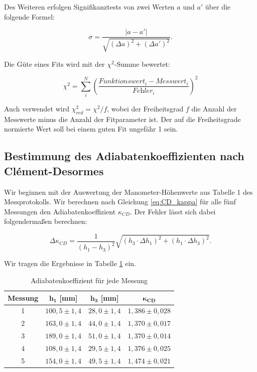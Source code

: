 \documentclass{article}
\begin{document}
Des Weiteren erfolgen Signifikanztests von zwei Werten $a$ und $a'$ über die folgende Formel:

\begin{equation}
    \sigma = \frac{|a-a'|}{\sqrt{(\Delta a)^2 + (\Delta a')^2}}.
\end{equation}

Die Güte eines Fits wird mit der $\chi^2$-Summe bewertet:

\begin{equation}
    \chi^2 = \sum_i^N \left( \frac{\textit{Funktionswert}_i - \textit{Messwert}_i}{\textit{Fehler}_i} \right)^2
\end{equation}

Auch verwendet wird $\chi^2_{red} = \chi^2 / f$, wobei der Freiheitsgrad $f$ die Anzahl der Messwerte minus die Anzahl der Fitparameter ist. Der auf die Freiheitsgrade normierte Wert soll bei einem guten Fit ungefähr 1 sein.

\newpage

\subsection{Bestimmung des Adiabatenkoeffizienten nach Clément-Desormes}

Wir beginnen mit der Auswertung der Manometer-Höhenwerte aus Tabelle 1 des Messprotokolls. Wir berechnen nach Gleichung \ref{eq:CD_kappa} für alle fünf Messungen den Adiabatenkoeffizient $\kappa_{CD}$. Der Fehler lässt sich dabei folgendermaßen berechnen:

\begin{equation}
    \Delta \kappa_{CD} = \frac{1}{(h_1 - h_3)^2} \sqrt{(h_3 \cdot \Delta h_1)^2 + (h_1 \cdot \Delta h_3)^2}.
\end{equation}

Wir tragen die Ergebnisse in Tabelle \ref{tab:kappa_CD} ein.

\phantom{.}

\begin{table}[!h]
    \centering
    \begin{tabular}{cccc}
        \hline
        \textbf{Messung} & $\bm{h_1}$ [mm] & $\bm{h_3}$ [mm] & $\bm{\kappa_{CD}}$  \\ \hline
        1 & $100,5 \pm 1,4$ & $28,0 \pm 1,4$ & $1,386 \pm 0,028$     \\
        2 & $163,0 \pm 1,4$ & $44,0 \pm 1,4$ & $1,370 \pm 0,017$     \\
        3 & $189,0 \pm 1,4$ & $51,0 \pm 1,4$ & $1,370 \pm 0,014$     \\
        4 & $108,0 \pm 1,4$ & $29,5 \pm 1,4$ & $1,376 \pm 0,025$     \\
        5 & $154,0 \pm 1,4$ & $49,5 \pm 1,4$ & $1,474 \pm 0,021$     \\ \hline
    \end{tabular}%
    \caption{Adiabatenkoeffizient für jede Messung}
    \label{tab:kappa_CD}
\end{table}
\end{document}
